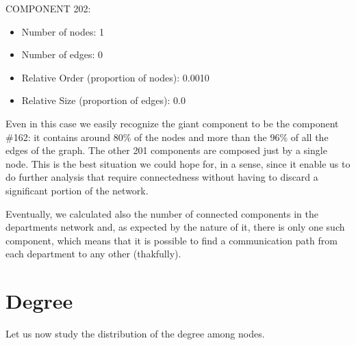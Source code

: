 \documentclass{report}
\theoremstyle{definition}
\theoremstyle{remark}
\begin{document}
COMPONENT 202:
\begin{itemize}
	\item Number of nodes: 1
	\item Number of edges: 0
	\item Relative Order (proportion of nodes): 0.0010
	\item Relative Size (proportion of edges): 0.0\\
\end{itemize}

Even in this case we easily recognize the giant component to be the component \#162: it contains around $80\%$ of the nodes and more than the $96\%$ of all the edges of the graph. The other 201 components are composed just by a single node. This is the best situation we could hope for, in a sense, since it enable us to do further analysis that require connectedness without having to discard a significant portion of the network.

Eventually, we calculated also the number of connected components in the departments network and, as expected by the nature of it, there is only one such component, which means that it is possible to find a communication path from each department to any other (thakfully).
\newpage
\section*{Degree}

Let us now study the distribution of the degree among nodes.
\end{document}
